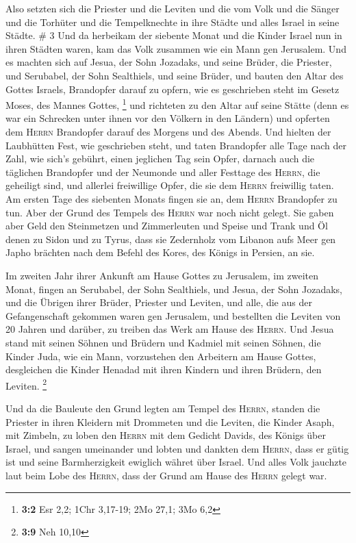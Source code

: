  Also setzten sich die Priester und die Leviten und die
vom Volk und die Sänger und die Torhüter und die Tempelknechte in ihre
Städte und alles Israel in seine Städte. \# 3  Und da
herbeikam der siebente Monat und die Kinder Israel nun in ihren Städten
waren, kam das Volk zusammen wie ein Mann gen Jerusalem. 
Und es machten sich auf Jesua, der Sohn Jozadaks, und seine Brüder, die
Priester, und Serubabel, der Sohn Sealthiels, und seine Brüder, und
bauten den Altar des Gottes Israels, Brandopfer darauf zu opfern, wie es
geschrieben steht im Gesetz Moses, des Mannes Gottes, \footnote{\textbf{3:2}
  Esr 2,2; 1Chr 3,17-19; 2Mo 27,1; 3Mo 6,2}  und richteten
zu den Altar auf seine Stätte (denn es war ein Schrecken unter ihnen vor
den Völkern in den Ländern) und opferten dem \textsc{Herrn} Brandopfer
darauf des Morgens und des Abends.  Und hielten der
Laubhütten Fest, wie geschrieben steht, und taten Brandopfer alle Tage
nach der Zahl, wie sich's gebührt, einen jeglichen Tag sein Opfer,
 darnach auch die täglichen Brandopfer und der Neumonde
und aller Festtage des \textsc{Herrn}, die geheiligt sind, und allerlei
freiwillige Opfer, die sie dem \textsc{Herrn} freiwillig taten.
 Am ersten Tage des siebenten Monats fingen sie an, dem
\textsc{Herrn} Brandopfer zu tun. Aber der Grund des Tempels des
\textsc{Herrn} war noch nicht gelegt.  Sie gaben aber Geld
den Steinmetzen und Zimmerleuten und Speise und Trank und Öl denen zu
Sidon und zu Tyrus, dass sie Zedernholz vom Libanon aufs Meer gen Japho
brächten nach dem Befehl des Kores, des Königs in Persien, an sie.

 Im zweiten Jahr ihrer Ankunft am Hause Gottes zu
Jerusalem, im zweiten Monat, fingen an Serubabel, der Sohn Sealthiels,
und Jesua, der Sohn Jozadaks, und die Übrigen ihrer Brüder, Priester und
Leviten, und alle, die aus der Gefangenschaft gekommen waren gen
Jerusalem, und bestellten die Leviten von 20 Jahren und darüber, zu
treiben das Werk am Hause des \textsc{Herrn}.  Und Jesua
stand mit seinen Söhnen und Brüdern und Kadmiel mit seinen Söhnen, die
Kinder Juda, wie ein Mann, vorzustehen den Arbeitern am Hause Gottes,
desgleichen die Kinder Henadad mit ihren Kindern und ihren Brüdern, den
Leviten. \footnote{\textbf{3:9} Neh 10,10}

 Und da die Bauleute den Grund legten am Tempel des
\textsc{Herrn}, standen die Priester in ihren Kleidern mit Drommeten und
die Leviten, die Kinder Asaph, mit Zimbeln, zu loben den \textsc{Herrn}
mit dem Gedicht Davids, des Königs über Israel,  und
sangen umeinander und lobten und dankten dem \textsc{Herrn}, dass er
gütig ist und seine Barmherzigkeit ewiglich währet über Israel. Und
alles Volk jauchzte laut beim Lobe des \textsc{Herrn}, dass der Grund am
Hause des \textsc{Herrn} gelegt war.

